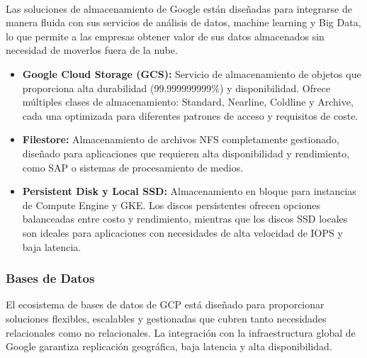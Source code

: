 {                \paragraph{}Las soluciones de almacenamiento de Google están diseñadas para integrarse de manera fluida con sus servicios de análisis de datos, machine learning y Big Data, lo que permite a las empresas obtener valor de sus datos almacenados sin necesidad de moverlos fuera de la nube.
                
                \begin{itemize}
                    \item \textbf{Google Cloud Storage (GCS):} Servicio de almacenamiento de objetos que proporciona alta durabilidad (99.999999999\%) y disponibilidad. Ofrece múltiples clases de almacenamiento: Standard, Nearline, Coldline y Archive, cada una optimizada para diferentes patrones de acceso y requisitos de coste.
                    \item \textbf{Filestore:} Almacenamiento de archivos NFS completamente gestionado, diseñado para aplicaciones que requieren alta disponibilidad y rendimiento, como SAP o sistemas de procesamiento de medios.
                    \item \textbf{Persistent Disk y Local SSD:} Almacenamiento en bloque para instancias de Compute Engine y GKE. Los discos persistentes ofrecen opciones balanceadas entre costo y rendimiento, mientras que los discos SSD locales son ideales para aplicaciones con necesidades de alta velocidad de IOPS y baja latencia.
                \end{itemize}
            
            \subsubsection{Bases de Datos}
                El ecosistema de bases de datos de GCP está diseñado para proporcionar soluciones flexibles, escalables y gestionadas que cubren tanto necesidades relacionales como no relacionales. La integración con la infraestructura global de Google garantiza replicación geográfica, baja latencia y alta disponibilidad.
                
}
